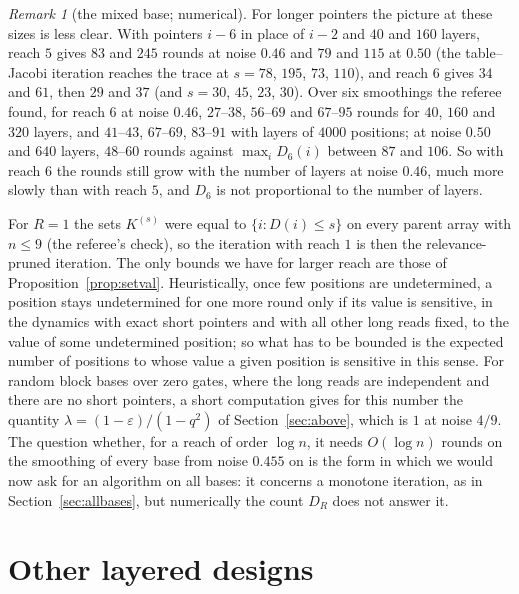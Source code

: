 \documentclass[11pt]{amsart}
\theoremstyle{definition}
\theoremstyle{remark}
\newtheorem{remark}[theorem]{Remark}
\newcommand{\eps}{\varepsilon}
\begin{document}
\begin{remark}[the mixed base; numerical]
For longer pointers the picture at these sizes is less clear. With pointers $i-6$ in place of
$i-2$ and $40$ and $160$ layers, reach $5$ gives $83$ and $245$ rounds at noise $0.46$ and $79$
and $115$ at $0.50$ (the table--Jacobi iteration reaches the trace at $s=78$, $195$, $73$,
$110$), and reach $6$ gives $34$ and $61$, then $29$ and $37$ (and $s=30$, $45$, $23$, $30$).
Over six smoothings the referee found, for reach $6$ at noise $0.46$, $27$--$38$, $56$--$69$ and
$67$--$95$ rounds for $40$, $160$ and $320$ layers, and $41$--$43$, $67$--$69$, $83$--$91$ with
layers of $4000$ positions; at noise $0.50$ and $640$ layers, $48$--$60$ rounds against
$\max_iD_6(i)$ between $87$ and $106$. So with reach $6$ the rounds still grow with the number
of layers at noise $0.46$, much more slowly than with reach $5$, and $D_6$ is not proportional
to the number of layers.

For $R=1$ the sets $K^{(s)}$ were equal to $\{i:D(i)\le s\}$ on every parent array with $n\le9$
(the referee's check), so the iteration with reach $1$ is then the relevance-pruned iteration.
The only bounds we have for larger reach are those of Proposition~\ref{prop:setval}.
Heuristically, once few positions are undetermined, a position stays undetermined for one more
round only if its value is sensitive, in the dynamics with exact short pointers and with all
other long reads fixed, to the value of some undetermined position; so what has to be bounded is
the expected number of positions to whose value a given position is sensitive in this sense. For
random block bases over zero gates, where the long reads are independent and there are no short
pointers, a short computation gives for this number the quantity $\lambda=(1-\eps)/(1-q^2)$ of
Section~\ref{sec:above}, which is $1$ at noise $4/9$. The
question whether, for a reach of order $\log n$, it needs $O(\log n)$ rounds on the smoothing of
every base from noise $0.455$ on is the form in which we would now ask for an algorithm on all
bases: it concerns a monotone iteration, as in Section~\ref{sec:allbases}, but numerically the
count $D_R$ does not answer it.
\end{remark}

\section{Other layered designs}\label{sec:designs}
\end{document}
